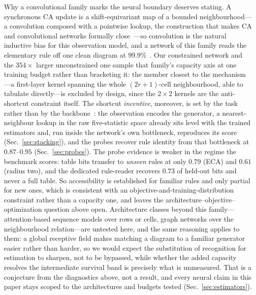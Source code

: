 \documentclass[aip,cha,amsmath,amssymb,reprint,floatfix]{revtex4-2}
\begin{document}
Why a convolutional family marks the neural boundary deserves stating. A
synchronous CA update is a shift-equivariant map of a bounded
neighbourhood---a convolution composed with a pointwise lookup, the
construction that makes CA and convolutional networks formally
close~\cite{gilpin2019}---so convolution is the
natural inductive bias for this observation model, and a network of this
family reads the elementary rule off one clean diagram at
$99.9\%$~\cite{rollier2024cnn}. Our constrained network and the $354\times$
larger unconstrained one sample that family's capacity axis at one training
budget rather than bracketing it: the member closest to the mechanism---a
first-layer kernel spanning the whole $(2r{+}1)$-cell neighbourhood, able to
tabulate directly---is excluded by design, since the $2\times2$ kernels are
the anti-shortcut constraint itself.
The shortcut \emph{incentive}, moreover, is set by the task rather than by
the backbone~\cite{geirhos2020shortcut}: the observation encodes the
generator, a nearest-neighbour lookup in the raw five-statistic space
already sits level with the trained estimators and, run inside the
network's own bottleneck, reproduces its score (Sec.~\ref{sec:stacking}),
and the probes recover rule identity from that bottleneck at
$0.87$--$0.95$ (Sec.~\ref{sec:probes}). The probe evidence is weaker in the
regime the benchmark scores: table bits transfer to \emph{unseen} rules at
only $0.79$ (ECA) and $0.61$ (radius two), and the dedicated rule-reader
recovers $0.73$ of held-out bits and never a full table. So accessibility is
established for familiar rules and only partial for new ones, which is
consistent with an objective-and-training-distribution constraint rather
than a capacity one, and leaves the
architecture--objective--optimization question above open. Architecture
classes beyond this family---attention-based sequence models over rows or
cells, graph networks over the neighbourhood relation---are untested here,
and the same reasoning applies to them: a global receptive field makes
matching a diagram to a familiar generator easier rather than harder, so we
would expect the substitution of recognition for estimation to sharpen, not
to be bypassed, while whether the added capacity resolves the intermediate
survival band is precisely what is unmeasured. That is a conjecture from the
diagnostics above, not a result, and every neural claim in this paper stays
scoped to the architectures and budgets tested
(Sec.~\ref{sec:estimators}).
\end{document}

